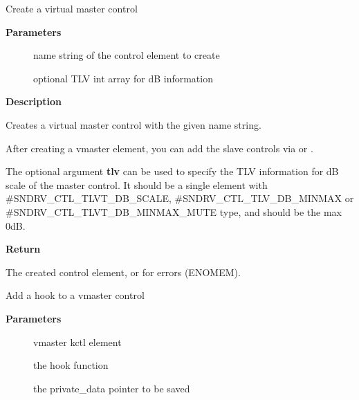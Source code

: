 \documentclass[a4paper,8pt,english]{sphinxmanual}
\begin{document}
\begin{fulllineitems}
\label{sound/kernel-api/alsa-driver-api:c.snd_ctl_make_virtual_master}
Create a virtual master control

\end{fulllineitems}


\textbf{Parameters}
\begin{description}
\item[{}] \leavevmode
name string of the control element to create

\item[{}] \leavevmode
optional TLV int array for dB information

\end{description}

\textbf{Description}

Creates a virtual master control with the given name string.

After creating a vmaster element, you can add the slave controls
via {\hyperref[sound/kernel\string-api/alsa\string-driver\string-api:c.snd_ctl_add_slave]{\emph{}}} or {\hyperref[sound/kernel\string-api/alsa\string-driver\string-api:c.snd_ctl_add_slave_uncached]{\emph{}}}.

The optional argument \textbf{tlv} can be used to specify the TLV information
for dB scale of the master control.  It should be a single element
with \#SNDRV\_CTL\_TLVT\_DB\_SCALE, \#SNDRV\_CTL\_TLV\_DB\_MINMAX or
\#SNDRV\_CTL\_TLVT\_DB\_MINMAX\_MUTE type, and should be the max 0dB.

\textbf{Return}

The created control element, or  for errors (ENOMEM).

\begin{fulllineitems}
\label{sound/kernel-api/alsa-driver-api:c.snd_ctl_add_vmaster_hook}
Add a hook to a vmaster control

\end{fulllineitems}


\textbf{Parameters}
\begin{description}
\item[{}] \leavevmode
vmaster kctl element

\item[{}] \leavevmode
the hook function

\item[{}] \leavevmode
the private\_data pointer to be saved

\end{description}
\end{document}
